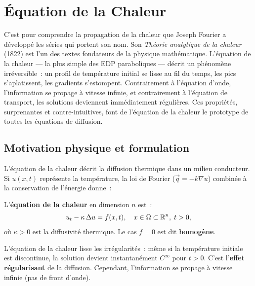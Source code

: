 \chapter{\'Equation de la Chaleur}
\label{ch:chaleur}

C'est pour comprendre la propagation de la chaleur que Joseph Fourier a d\'evelopp\'e les s\'eries qui portent son nom. Son \emph{Th\'eorie analytique de la chaleur} (1822) est l'un des textes fondateurs de la physique math\'ematique. L'\'equation de la chaleur --- la plus simple des EDP paraboliques --- d\'ecrit un ph\'enom\`ene irr\'eversible~: un profil de temp\'erature initial se lisse au fil du temps, les pics s'aplatissent, les gradients s'estompent. Contrairement \`a l'\'equation d'onde, l'information se propage \`a vitesse infinie, et contrairement \`a l'\'equation de transport, les solutions deviennent imm\'ediatement r\'eguli\`eres. Ces propri\'et\'es, surprenantes et contre-intuitives, font de l'\'equation de la chaleur le prototype de toutes les \'equations de diffusion.

\section{Motivation physique et formulation}

L'\'equation de la chaleur d\'ecrit la diffusion thermique dans un milieu
conducteur. Si $u(x,t)$ repr\'esente la temp\'erature, la loi de Fourier
($\vec{q} = -k\nabla u$) combin\'ee \`a la conservation de l'\'energie donne~:

\begin{definition}
L'\textbf{\'equation de la chaleur} en dimension $n$ est~:
\begin{equation}\label{eq:chaleur}
    u_t - \kappa\, \Delta u = f(x,t), \quad x \in \Omega \subset \mathbb{R}^n,\; t > 0,
\end{equation}
o\`u $\kappa > 0$ est la diffusivit\'e thermique. Le cas $f = 0$ est dit
\textbf{homog\`ene}.
\end{definition}

\begin{intuition}
L'\'equation de la chaleur lisse les irr\'egularit\'es~: m\^eme si la
temp\'erature initiale est discontinue, la solution devient instantan\'ement
$C^\infty$ pour $t > 0$. C'est l'\textbf{effet r\'egularisant} de la diffusion.
Cependant, l'information se propage \`a vitesse infinie (pas de front d'onde).
\end{intuition}

